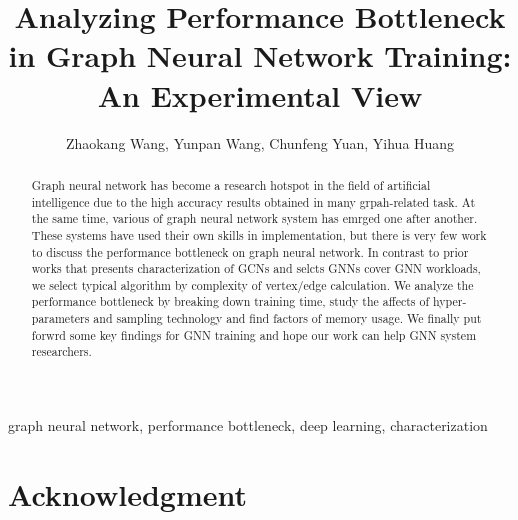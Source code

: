 \documentclass{elsarticle}
\begin{document}
\begin{frontmatter}

\title{Analyzing Performance Bottleneck in Graph Neural Network Training: An Experimental View}
\author{Zhaokang Wang, Yunpan Wang, Chunfeng Yuan, Yihua Huang}
\address{State Key Laboratory for Novel Software Technology, Department of Computer Science and Technology, Nanjing University, Nanjing 210023, China}

\begin{abstract}
    Graph neural network has become a research hotspot in the field of artificial intelligence due to the high accuracy results 
    obtained in many grpah-related task. At the same time, various of graph neural network system has emrged one after another.
    These systems have used their own skills in implementation, but there is very few work to discuss the performance bottleneck
    on graph neural network. In contrast to prior works that presents characterization of GCNs and selcts GNNs cover GNN workloads,
    we select typical algorithm by complexity of vertex/edge calculation. We analyze the performance bottleneck by breaking down training
    time, study the affects of hyper-parameters and sampling technology and find factors of memory usage. We finally put forwrd some key
    findings for GNN training and hope our work can help GNN system researchers. 
\end{abstract}

\begin{keyword}
    graph neural network, performance bottleneck, deep learning, characterization
\end{keyword}

\end{frontmatter}

\linenumbers










\section*{Acknowledgment}


\end{document}
